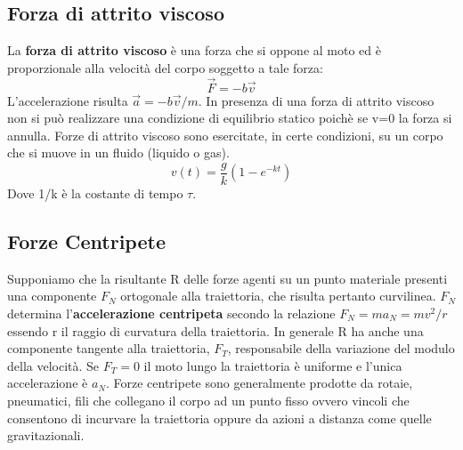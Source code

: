 \documentclass{article}
\numberwithin{equation}{subsection}
\begin{document}
  \subsection{Forza di attrito viscoso}
   La \textbf{forza di attrito viscoso} è una forza che si oppone al moto ed è proporzionale alla velocità del corpo soggetto a tale forza:
   \begin{equation}
       \vec{F}=-b\vec{v}
   \end{equation}
   L'accelerazione risulta $\vec{a}=-b\vec{v}/m$. In presenza di una forza di attrito viscoso non si può realizzare una condizione di equilibrio statico poichè se v=0 la forza si annulla. Forze di attrito viscoso sono esercitate, in certe condizioni, su un corpo che si muove in un fluido (liquido o gas).
   \begin{equation}
       v(t)=\frac{g}{k}(1-e^{-kt})
   \end{equation}
   Dove 1/k è la costante di tempo $\tau$.
   \subsection{Forze Centripete}
   Supponiamo che la risultante R delle forze agenti su un punto materiale presenti una componente $F_N$ ortogonale alla traiettoria, che risulta pertanto curvilinea. $F_N$ determina l'\textbf{accelerazione centripeta} secondo la relazione $F_N=ma_N=mv^2/r$ essendo r il raggio di curvatura della traiettoria. In generale R ha anche una componente tangente alla traiettoria, $F_T$, responsabile della variazione del modulo della velocità. Se $F_T=0$ il moto lungo la traiettoria è uniforme e l'unica accelerazione è $a_N$. Forze centripete sono generalmente prodotte da rotaie, pneumatici, fili che collegano il corpo ad un punto fisso ovvero vincoli che consentono di incurvare la traiettoria oppure da azioni a distanza come quelle gravitazionali.
\end{document}
